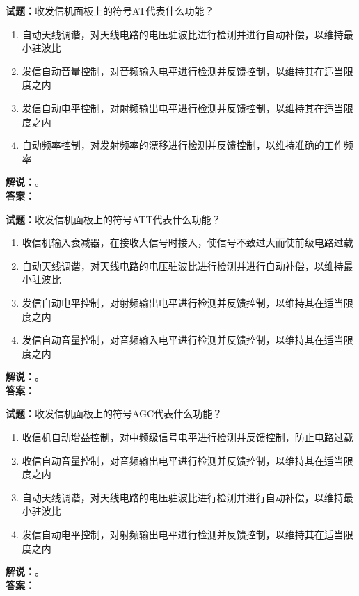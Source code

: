 \documentclass{ctexbook}
\begin{document}
\noindent\textbf{试题：}收发信机面板上的符号AT代表什么功能？
\begin{enumerate}[leftmargin=3em]
  \item 自动天线调谐，对天线电路的电压驻波比进行检测并进行自动补偿，以维持最小驻波比
  \item 发信自动音量控制，对音频输入电平进行检测并反馈控制，以维持其在适当限度之内
  \item 发信自动电平控制，对射频输出电平进行检测并反馈控制，以维持其在适当限度之内
  \item 自动频率控制，对发射频率的漂移进行检测并反馈控制，以维持准确的工作频率
\end{enumerate}
\noindent\textbf{解说：}\textbf{}。\\\noindent\textbf{答案：}

\bigskip

\noindent\textbf{试题：}收发信机面板上的符号ATT代表什么功能？
\begin{enumerate}[leftmargin=3em]
  \item 收信机输入衰减器，在接收大信号时接入，使信号不致过大而使前级电路过载
  \item 自动天线调谐，对天线电路的电压驻波比进行检测并进行自动补偿，以维持最小驻波比
  \item 发信自动电平控制，对射频输出电平进行检测并反馈控制，以维持其在适当限度之内
  \item 发信自动音量控制，对音频输入电平进行检测并反馈控制，以维持其在适当限度之内
\end{enumerate}
\noindent\textbf{解说：}\textbf{}。\\\noindent\textbf{答案：}

\bigskip

\noindent\textbf{试题：}收发信机面板上的符号AGC代表什么功能？
\begin{enumerate}[leftmargin=3em]
  \item 收信机自动增益控制，对中频级信号电平进行检测并反馈控制，防止电路过载
  \item 收信自动音量控制，对音频输出电平进行检测并反馈控制，以维持其在适当限度之内
  \item 自动天线调谐，对天线电路的电压驻波比进行检测并进行自动补偿，以维持最小驻波比
  \item 发信自动电平控制，对射频输出电平进行检测并反馈控制，以维持其在适当限度之内
\end{enumerate}
\noindent\textbf{解说：}\textbf{}。\\\noindent\textbf{答案：}

\bigskip
\end{document}
